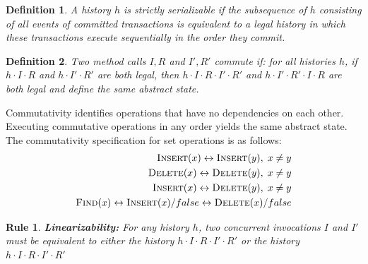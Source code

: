 \documentclass[]{sig-alternate-05-2015}
\newtheorem{definition}{Definition}
\newtheorem{crule}{Rule}
\begin{document}
\begin{definition}
    A history $h$ is strictly serializable if the subsequence of $h$ consisting of all events of committed transactions is equivalent to a legal history in which these transactions execute sequentially in the order they commit.
\end{definition}



\begin{definition}
    Two method calls $I,R$ and $I',R'$ commute if: for all histories $h$, if $h \cdot I \cdot R$ and $h \cdot I' \cdot R'$ are both legal, then $h \cdot I \cdot R \cdot I' \cdot R'$ and $h \cdot I' \cdot R' \cdot I \cdot R$ are both legal and define the same abstract state.
\end{definition}

Commutativity identifies operations that have no dependencies on each other.
Executing commutative operations in any order yields the same abstract state.
The commutativity specification for set operations is as follows:
\begin{equation}
    \label{eq:commute}
\begin{aligned}
    \textsc{Insert}(x) \leftrightarrow \textsc{Insert}(y),\;x \ne y \\
    \textsc{Delete}(x) \leftrightarrow \textsc{Delete}(y),\;x \ne y \\
    \textsc{Insert}(x) \leftrightarrow \textsc{Delete}(y),\;x \ne y \\
    \textsc{Find}(x) \leftrightarrow \textsc{Insert}(x)/false \leftrightarrow \textsc{Delete}(x)/false
\end{aligned}
\end{equation}

\begin{crule}
    \textbf{Linearizability:} For any history $h$, two concurrent invocations $I$ and $I'$ must be equivalent to either the history $h \cdot I \cdot R \cdot I' \cdot R'$ or the history $h \cdot I \cdot R \cdot I' \cdot R'$
\end{crule}
\end{document}
